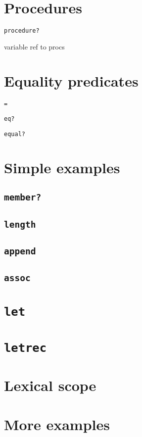 \documentclass{book}
\begin{document}
\section{Procedures}

\verb|procedure?|

variable ref to procs

\section{Equality predicates}

\verb|=|

\verb|eq?|

\verb|equal?|

\section{Simple examples}

\subsection{\texttt{member?}}

\subsection{\texttt{length}}

\subsection{\texttt{append}}

\subsection{\texttt{assoc}}

\section{\texttt{let}}

\section{\texttt{letrec}}

\section{Lexical scope}

\section{More examples}
\end{document}
